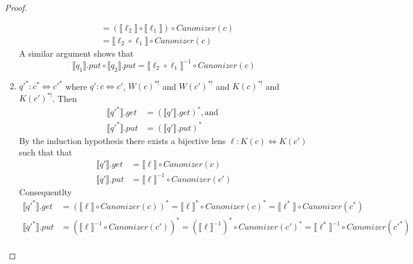 \documentclass{svproc}
\newcommand{\canonizer}{\ensuremath{\mathit{Canonizer}}}
\begin{document}
\begin{proof}
\begin{enumerate}
\begin{align*}
                                                                        &= (\llbracket \ell_2 \rrbracket \circ \llbracket \ell_1 \rrbracket) \circ
                                                                          \canonizer(c)\\
                                                                        &= \llbracket \ell_2  \circ  \ell_1 \rrbracket \circ
                                                                          \canonizer(c)
    \end{align*} 
    A similar argument shows that 
    $$\llbracket q_1 \rrbracket.put \circ \llbracket q_2 \rrbracket.put =
    \llbracket \ell_2  \circ  \ell_1 \rrbracket^{-1} \circ
    \canonizer(c)$$
  \item  
    ${q'}^* : c^* \Leftrightarrow {c'}^*$ where $q' : c \Leftrightarrow c'$,
    $W(c)^{*!}$ and $W(c')^{*!}$ and $K(c)^{*!}$ and $K(c')^{*!}$. Then
    \begin{align*}
      \llbracket {q'}^* \rrbracket.get &= (\llbracket q' \rrbracket.get)^*, \text{
                                         and }\\
      \llbracket {q'}^* \rrbracket.put &= (\llbracket q' \rrbracket.put)^*
    \end{align*}
    By the induction hypothesis there exists a bijective lens $\ell : K(c)
    \Leftrightarrow K(c')$ such that 
    that
    \begin{align*}
      \llbracket q' \rrbracket.get &= \llbracket \ell \rrbracket \circ
                                     \canonizer(c)\\
      \llbracket q' \rrbracket.put &= {\llbracket \ell \rrbracket}^{-1} \circ
                                     \canonizer(c')
    \end{align*}
    Consequentlty
    \begin{align*}
      \llbracket {q'}^* \rrbracket.get &= (\llbracket \ell \rrbracket \circ
                                         \canonizer(c))^* = \llbracket \ell \rrbracket^* \circ
                                         \canonizer(c)^* = \llbracket \ell^* \rrbracket \circ
                                         \canonizer(c^*)\\
      \llbracket {q'}^* \rrbracket.put &= (\llbracket \ell \rrbracket^{-1} \circ
                                         \canonizer(c'))^* = (\llbracket \ell \rrbracket^{-1})^* \circ
                                         \canonizer(c')^* = \llbracket \ell^* \rrbracket^{-1} \circ
                                         \canonizer(c'^*)\\

\end{align*}
\end{enumerate}
\end{proof}
\end{document}
